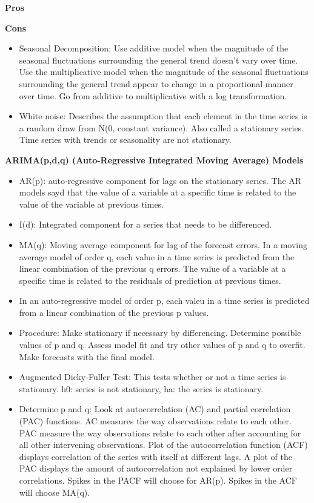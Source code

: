 \documentclass[]{book}
\begin{document}
\textbf{Pros}

\textbf{Cons}

\begin{itemize}
\item
  Seasonal Decomposition; Use additive model when the magnitude of the
  seasonal fluctuations surrounding the general trend doesn't vary over
  time. Use the multiplicative model when the magnitude of the seasonal
  fluctuations surrounding the general trend appear to change in a
  proportional manner over time. Go from additive to multiplicative with
  a log transformation.
\item
  White noise: Describes the assumption that each element in the time
  series is a random draw from N(0, constant variance). Also called a
  stationary series. Time series with trends or seasonality are not
  stationary.
\end{itemize}

\textbf{ARIMA(p,d,q) (Auto-Regressive Integrated Moving Average) Models}

\begin{itemize}
\item
  AR(p): auto-regressive component for lags on the stationary series.
  The AR models sayd that the value of a variable at a specific time is
  related to the value of the variable at previous times.
\item
  I(d): Integrated component for a series that needs to be differenced.
\item
  MA(q): Moving average component for lag of the forecast errors. In a
  moving average model of order q, each value in a time series is
  predicted from the linear combination of the previous q errors. The
  value of a variable at a specific time is related to the residuals of
  prediction at previous times.
\item
  In an auto-regressive model of order p, each valeu in a time series is
  predicted from a linear combination of the previous p values.
\item
  Procedure: Make stationary if necessary by differencing. Determine
  possible values of p and q. Assess model fit and try other values of p
  and q to overfit. Make forecasts with the final model.
\item
  Augmented Dicky-Fuller Test: This tests whether or not a time series
  is stationary. h0: series is not stationary, ha: the series is
  stationary.
\item
  Determine p and q: Look at autocorrelation (AC) and partial
  correlation (PAC) functions. AC measures the way observations relate
  to each other. PAC measure the way observations relate to each other
  after accounting for all other intervening observations. Plot of the
  autocorrelation function (ACF) displays correlation of the series with
  itself at different lags. A plot of the PAC displays the amount of
  autocorrelation not explained by lower order correlations. Spikes in
  the PACF will choose for AR(p). Spikes in the ACF will choose MA(q).
\end{itemize}
\end{document}
